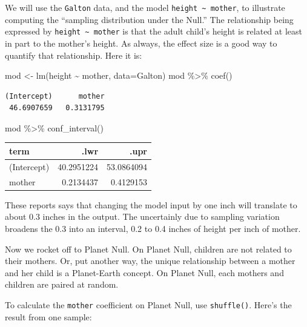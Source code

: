 \documentclass[
  letterpaper,
  DIV=11,
  numbers=noendperiod,
  oneside]{scrreprt}
\newenvironment{Shaded}{\begin{snugshade}}{\end{snugshade}}
\newcommand{\AttributeTok}[1]{\textcolor[rgb]{0.40,0.45,0.13}{#1}}
\newcommand{\FunctionTok}[1]{\textcolor[rgb]{0.28,0.35,0.67}{#1}}
\newcommand{\NormalTok}[1]{\textcolor[rgb]{0.00,0.23,0.31}{#1}}
\newcommand{\OtherTok}[1]{\textcolor[rgb]{0.00,0.23,0.31}{#1}}
\newcommand{\SpecialCharTok}[1]{\textcolor[rgb]{0.37,0.37,0.37}{#1}}
\begin{document}
We will use the \texttt{Galton} data, and the model
\texttt{height\ \textasciitilde{}\ mother}, to illustrate computing the
``sampling distribution under the Null.'' The relationship being
expressed by \texttt{height\ \textasciitilde{}\ mother} is that the
adult child's height is related at least in part to the mother's height.
As always, the effect size is a good way to quantify that relationship.
Here it is:

\begin{Shaded}
\begin{Highlighting}[]
\NormalTok{mod }\OtherTok{\textless{}{-}} \FunctionTok{lm}\NormalTok{(height }\SpecialCharTok{\textasciitilde{}}\NormalTok{ mother, }\AttributeTok{data=}\NormalTok{Galton) }
\NormalTok{mod }\SpecialCharTok{\%\textgreater{}\%} \FunctionTok{coef}\NormalTok{()}
\end{Highlighting}
\end{Shaded}

\begin{verbatim}
(Intercept)      mother 
 46.6907659   0.3131795 
\end{verbatim}

\begin{Shaded}
\begin{Highlighting}[]
\NormalTok{mod }\SpecialCharTok{\%\textgreater{}\%} \FunctionTok{conf\_interval}\NormalTok{()}
\end{Highlighting}
\end{Shaded}

\ttfamily 
\begin{tabular}{lrr}
\toprule
term & .lwr & .upr\\
\midrule
(Intercept) & 40.2951224 & 53.0864094\\
mother & 0.2134437 & 0.4129153\\
\bottomrule
\end{tabular} \normalfont
\bigskip

These reports says that changing the model input by one inch will
translate to about 0.3 inches in the output. The uncertainly due to
sampling variation broadens the 0.3 into an interval, 0.2 to 0.4 inches
of height per inch of mother.

Now we rocket off to Planet Null. On Planet Null, children are not
related to their mothers. Or, put another way, the unique relationship
between a mother and her child is a Planet-Earth concept. On Planet
Null, each mothers and children are paired at random.

To calculate the \texttt{mother} coefficient on Planet Null, use
\texttt{shuffle()}. Here's the result from one sample:
\end{document}
